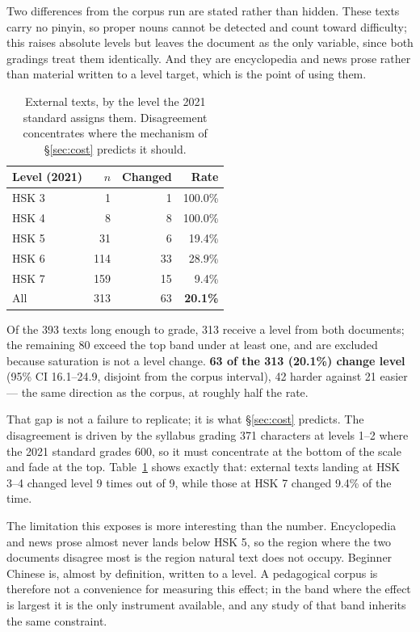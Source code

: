\documentclass[11pt]{article}
\begin{document}
Two differences from the corpus run are stated rather than hidden. These texts
carry no pinyin, so proper nouns cannot be detected and count toward
difficulty; this raises absolute levels but leaves the document as the only
variable, since both gradings treat them identically. And they are encyclopedia
and news prose rather than material written to a level target, which is the
point of using them.

\begin{table}[t]
\centering\small
\begin{tabular}{@{}lrrr@{}}
\toprule
\textbf{Level (2021)} & \textbf{$n$} & \textbf{Changed} & \textbf{Rate} \\
\midrule
HSK 3 & 1   & 1  & 100.0\% \\
HSK 4 & 8   & 8  & 100.0\% \\
HSK 5 & 31  & 6  & 19.4\% \\
HSK 6 & 114 & 33 & 28.9\% \\
HSK 7 & 159 & 15 & 9.4\% \\
\midrule
All   & 313 & 63 & \textbf{20.1\%} \\
\bottomrule
\end{tabular}
\caption{External texts, by the level the 2021 standard assigns them.
Disagreement concentrates where the mechanism of \S\ref{sec:cost} predicts it
should.}
\label{tab:external}
\end{table}

Of the 393 texts long enough to grade, 313 receive a level from both documents;
the remaining 80 exceed the top band under at least one, and are excluded
because saturation is not a level change. \textbf{63 of the 313 (20.1\%) change
level} (95\% CI 16.1--24.9, disjoint from the corpus interval), 42 harder
against 21 easier --- the same direction as the corpus, at
roughly half the rate.

That gap is not a failure to replicate; it is what \S\ref{sec:cost} predicts.
The disagreement is driven by the syllabus grading 371 characters at levels
1--2 where the 2021 standard grades 600, so it must concentrate at the bottom
of the scale and fade at the top. Table~\ref{tab:external} shows exactly that:
external texts landing at HSK 3--4 changed level 9 times out of 9, while those
at HSK 7 changed 9.4\% of the time.

The limitation this exposes is more interesting than the number. Encyclopedia
and news prose almost never lands below HSK 5, so the region where the two
documents disagree most is the region natural text does not occupy. Beginner
Chinese is, almost by definition, written to a level. A pedagogical corpus is
therefore not a convenience for measuring this effect; in the band where the
effect is largest it is the only instrument available, and any study of that
band inherits the same constraint.
\end{document}
